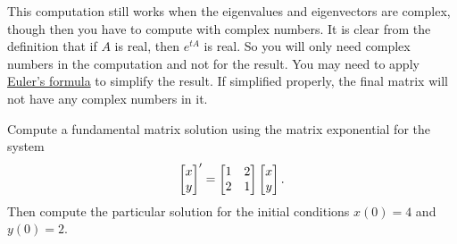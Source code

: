 This computation still works when the eigenvalues and
eigenvectors are complex, though then you have to compute with complex
numbers.  It is clear from the definition that if $A$ is real,
then $e^{tA}$ is real.  So you will only need complex numbers in the
computation and not for the result.  You may need to apply
\hyperref[eulersformula]{Euler's formula} to simplify the
result.  If simplified properly, the final matrix will not have any complex
numbers in it.

\begin{example}
Compute a fundamental matrix solution using the matrix exponential
for the system
\begin{equation*}
\begin{bmatrix}
x \\ y
\end{bmatrix} '
=
\begin{bmatrix}
1 & 2 \\
2 & 1
\end{bmatrix}
\begin{bmatrix}
x \\ y
\end{bmatrix} .
\avoidbreak
\end{equation*}
Then compute the particular solution for the initial conditions
$x(0) = 4$ and $y(0) = 2$.


\end{example}

